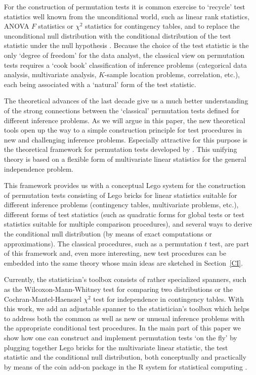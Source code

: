 \documentclass{article}
\newcommand{\Rpackage}[1]{{\normalfont\fontseries{b}\selectfont #1}}
\newcommand{\RR}{\textsf{R}}
\begin{document}
For the construction of permutation tests it is common exercise to `recycle'
test statistics well known from the unconditional world, such as linear rank
statistics, ANOVA $F$ statistics or $\chi^2$ statistics for
contingency tables, and to replace the unconditional null distribution with
the conditional distribution of the test statistic under the null
hypothesis \citep{Edgington1987,Good2000,Pesarin2001,Ernst2004}. 
Because the choice of the test statistic is the only `degree of freedom' for
the data analyst,
the classical view on permutation tests requires 
a `cook book' classification of inference problems (categorical data
analysis, multivariate analysis, $K$-sample location problems, correlation,
etc.), each being associated with a `natural' form of the test statistic.

The theoretical advances of the last decade \citep[notably][]{StrasserWeber1999,
Pesarin2001,JanssenPauls2003}
give us a much better understanding of the strong connections between the 
`classical' permutation tests defined for different inference problems. 
As we will argue in this paper, the new
theoretical tools open up the way to a simple construction principle 
for test procedures in new and challenging inference problems.
Especially attractive for this purpose is the theoretical framework for
permutation tests developed by \cite{StrasserWeber1999}. This unifying
theory is based on a flexible form of multivariate linear statistics for the
general independence problem. 

This framework provides us with a conceptual Lego system for the construction
of permutation tests consisting of Lego bricks for linear statistics
suitable for different inference problems (contingency tables, multivariate
problems, etc.), different forms of test statistics (such as quadratic forms
for global tests or test statistics suitable for multiple comparison
procedures), and several ways to derive the conditional null
distribution (by means of exact computations or approximations). 
The classical procedures, such as a permutation $t$ test, are part
of this framework and, even more interesting, new test procedures can be
embedded into the same theory whose main ideas are sketched in
Section~\ref{CI}.

Currently, the statistician's toolbox consists of rather specialized spanners,
such as the Wilcoxon-Mann-Whitney test for comparing two distributions 
or the Cochran-Mantel-Haenszel $\chi^2$ test for independence in
contingency tables. With this work, we add an adjustable spanner to the 
statistician's toolbox which helps to address both the common as well 
as new or unusual inference problems with the appropriate 
conditional test procedures. In the main part of this paper we show how one can
construct and implement permutation tests `on the fly' by plugging together Lego bricks for
the multivariate linear statistic, the test statistic and the conditional
null distribution, both conceptually and practically by means of the 
\Rpackage{coin} add-on package 
 \citep{PKG:coina} in the \RR{} system for statistical computing
\citep{Rcore2005}.
\end{document}
